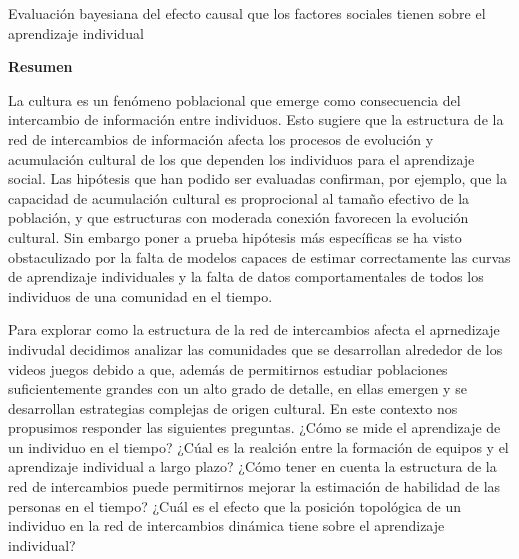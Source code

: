 \documentclass[a4paper,10pt]{book}
\theoremstyle{definition}
\newcommand{\TITULO}[0]{Evaluación bayesiana del efecto causal que los factores sociales tienen sobre el aprendizaje individual}
\begin{document}
\newpage

\begin{center}
\Large \TITULO \normalsize
\end{center}

\hspace{2cm}

\begin{center}
\textbf{Resumen}
\end{center}



La cultura es un fen\'omeno poblacional que emerge como consecuencia del intercambio de informaci\'on entre individuos.
%
Esto sugiere que la estructura de la red de intercambios de información afecta los procesos de evolución y acumulaci\'on cultural de los que dependen los individuos para el aprendizaje social.
%
Las hipótesis que han podido ser evaluadas confirman, por ejemplo, que la capacidad de acumulación cultural es proprocional al tamaño efectivo de la población, y que estructuras con moderada conexión favorecen la evolución cultural.
%
Sin embargo poner a prueba hipótesis más específicas se ha visto obstaculizado por la falta de modelos capaces de estimar correctamente las curvas de aprendizaje individuales y la falta de datos comportamentales de todos los individuos de una comunidad en el tiempo.


Para explorar como la estructura de la red de intercambios afecta el aprnedizaje indivudal decidimos analizar las comunidades que se desarrollan alrededor de los videos juegos debido a que, además de permitirnos estudiar poblaciones suficientemente grandes con un alto grado de detalle, en ellas emergen y se desarrollan estrategias complejas de origen cultural.
%
En este contexto nos propusimos responder las siguientes preguntas.
%
¿Cómo se mide el aprendizaje de un individuo en el tiempo?
%
¿C\'ual es la realción entre la formaci\'on de equipos y el aprendizaje individual a largo plazo?
%
¿Cómo tener en cuenta la estructura de la red de intercambios puede permitirnos mejorar la estimación de habilidad de las personas en el tiempo?
%
¿Cu\'al es el efecto que la posici\'on topológica de un individuo en la red de intercambios dinámica tiene sobre el aprendizaje individual?
\end{document}

